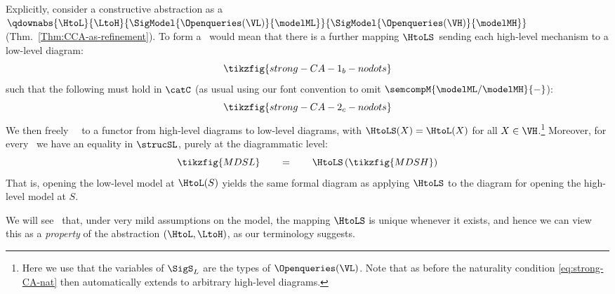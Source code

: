 \documentclass{article}
\begin{document}
Explicitly, consider a constructive abstraction as a \qdown{} 
$\qdownabs{\HtoL}{\LtoH}{\SigModel{\Openqueries(\VL)}{\modelML}}{\SigModel{\Openqueries(\VH)}{\modelMH}}$ 
(Thm.~\ref{Thm:CCA-as-refinement}). To form a \strongCCA~would mean that there is a further mapping $\HtoLS$~sending each high-level mechanism to a low-level diagram: 
\begin{equation} \label{eq:strong-CA}
\tikzfig{strong-CA-1_b-nodots}
\end{equation}
such that the following must hold in $\catC$ (as usual using our font convention to omit $\semcompM{\modelML / \modelMH}{-}$):
\begin{equation} \label{eq:strong-CA-nat}
\tikzfig{strong-CA-2_c-nodots}
\end{equation}
We then freely \ \rlc{$\HtoLS$}\ to a functor from high-level diagrams to low-level diagrams, with $\HtoLS(X) = \HtoL(X)$ for all $X \in \VH$.\footnote{Here we use that the variables of $\SigS_L$ are the types of $\Openqueries(\VL)$. Note that as before the naturality condition \eqref{eq:strong-CA-nat} then automatically extends to arbitrary high-level diagrams.} 
Moreover, for every \ we have an equality in $\strucSL$, purely at the diagrammatic level:
\begin{equation} \label{eq:strong-CA-diag}
\tikzfig{MDSL}
\qquad = \qquad
\HtoLS \left( \tikzfig{MDSH} \right)
\end{equation}
That is, opening the low-level model at $\HtoL(S)$ yields the same formal diagram as applying $\HtoLS$ to the diagram for opening the high-level model at $S$. 

We will see \ that, under very mild assumptions on the model, the mapping $\HtoLS$ is unique whenever it exists, and hence we can view this as a \emph{property} of the abstraction $(\HtoL,\LtoH)$, as our terminology suggests. 
\  
\end{document}
